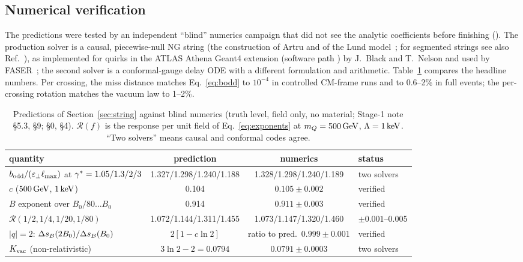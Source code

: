 \subsection{Numerical verification}\label{sec:string:numerics}
The predictions were tested by an independent ``blind'' numerics campaign that did not see the analytic coefficients
before finishing (). The production solver is a causal, piecewise-null NG string
(the construction of Artru and of the Lund model~\cite{Artru:1979ye,Andersson:1983ia}; for segmented strings see also
Ref.~\cite{Gubser:2016wno}), as implemented for quirks in the ATLAS Athena Geant4 extension (software path
) by J.~Black and T.~Nelson and used by FASER~\cite[App.~A]{FASER:2026fsy}; the second solver is a
conformal-gauge delay ODE with a different formulation and arithmetic. Table~\ref{tab:numerics} compares the headline
numbers. Per crossing, the miss distance matches Eq.~\eqref{eq:bodd} to $10^{-4}$ in controlled CM-frame runs and to
0.6--2\% in full events; the per-crossing rotation matches the vacuum law to 1--2\%.

\begin{table}[htbp]
\centering
\small
\caption{Predictions of Section~\ref{sec:string} against blind numerics (truth level, field only, no material; Stage-1
note \S5.3, \S9;  \S0, \S4). $\mathcal R(f)$ is the response per unit field of Eq.~\eqref{eq:exponents} at
$m_Q=500\,\mathrm{GeV}$, $\Lambda=1\,\mathrm{keV}$. ``Two solvers'' means causal and conformal codes agree.}
\label{tab:numerics}
\begin{tabularx}{\linewidth}{>{\raggedright\arraybackslash}Xccl}
\toprule
quantity & prediction & numerics & status\\
\midrule
$b_{\rm odd}/(\varepsilon_\perp\ell_{\max})$ at $\gamma^*=1.05/1.3/2/3$ & 1.327/1.298/1.240/1.188 & 1.328/1.298/1.240/1.189 & two solvers\\
$c$ ($500\,\mathrm{GeV}$, $1\,\mathrm{keV}$) & 0.104 & $0.105\pm0.002$ & verified\\
$B$ exponent over $B_0/80\ldots B_0$ & 0.914 & $0.911\pm0.003$ & verified\\
$\mathcal R(1/2,1/4,1/20,1/80)$ & 1.072/1.144/1.311/1.455 & 1.073/1.147/1.320/1.460 & $\pm0.001$--0.005\\
$|q|=2$: $\Delta s_B(2B_0)/\Delta s_B(B_0)$ & $2[1-c\ln2]$ & ratio to pred.\ $0.999\pm0.001$ & verified\\
$K_{\rm vac}$ (non-relativistic) & $3\ln2-2=0.0794$ & $0.0791\pm0.0003$ & two solvers\\
\bottomrule
\end{tabularx}
\end{table}

